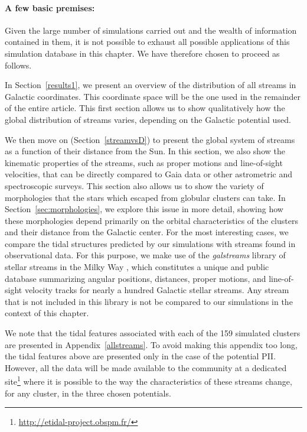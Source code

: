     \paragraph{A few basic premises:}
    Given the large number of simulations carried out and the wealth of information contained in them, it is not possible to exhaust all possible applications of this simulation database in this chapter. We have therefore chosen to proceed as follows. 

    In Section~\ref{results1}, we present an overview of the distribution of all streams in  Galactic coordinates. This coordinate space will be the one used in the remainder of the entire article. This first section allows us to show qualitatively how the global distribution of streams varies, depending on the Galactic potential used.

    We  then move on (Section~\ref{streamvsD}) to present the global system of streams as a function of their distance from the Sun. In this section, we also show the kinematic properties of the streams, such as proper motions and line-of-sight velocities, that can be directly compared to Gaia data or other astrometric and spectroscopic surveys. This section also allows us to show the variety of morphologies that the stars which escaped from globular clusters can take. In Section~\ref{sec:morphologies}, we explore this issue in more detail, showing how these morphologies depend primarily on the orbital characteristics of the clusters and their distance from the Galactic center. For the most interesting cases, we compare the tidal structures predicted by our simulations with streams found in observational data. For this purpose, we make use of the \emph{galstreams} library of stellar streams in the Milky Way \citep{2023MNRAS.520.5225M}, which constitutes a unique and public database summarizing angular positions, distances, proper motions, and line-of-sight velocity tracks for nearly a hundred Galactic stellar streams. Any stream that is not included in this library is not be compared to our simulations in the context of this chapter.

    We note that the tidal features associated with each of the 159 simulated clusters are presented in Appendix~\ref{allstreams}. To avoid making this appendix too long, the  tidal features above are presented only in the case of the potential PII. However, all the data will be made available to the community at a dedicated site\footnote{\url{http://etidal-project.obspm.fr/}} where it is possible to  the way the characteristics of these streams change, for any cluster, in the three chosen potentials. 

